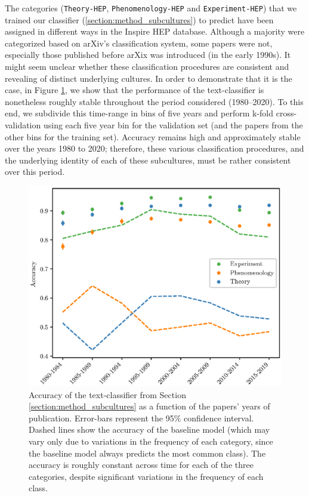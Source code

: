 \documentclass[smallextended]{svjour3}
\begin{document}
The categories (\texttt{Theory-HEP}, \texttt{Phenomenology-HEP} and \texttt{Experiment-HEP}) that we trained our classifier (\ref{section:method_subcultures}) to predict have been assigned in different ways in the Inspire HEP database. Although a majority were categorized based on arXiv's classification system, some papers were not, especially those published before arXix was introduced (in the early 1990s). It might seem unclear whether these classification procedures are consistent and revealing of distinct underlying cultures. In order to demonstrate that it is the case, in Figure \ref{fig:stability}, we show that the performance of the text-classifier is nonetheless roughly stable throughout the period considered (1980--2020). To this end, we subdivide this time-range in bins of five years and perform k-fold cross-validation using each five year bin for the validation set (and the papers from the other bins for the training set). Accuracy remains high and approximately stable over the years 1980 to 2020; therefore, these various classification procedures, and the underlying identity of each of these subcultures, must be rather consistent over this period.

\begin{figure}
    \centering
    \includegraphics{Fig8.eps}
    \caption{Accuracy of the text-classifier from Section \ref{section:method_subcultures} as a function of the papers' years of publication. Error-bars represent the 95\% confidence interval. Dashed lines show the accuracy of the baseline model (which may vary only due to variations in the frequency of each category, since the baseline model always predicts the most common class). The accuracy is roughly constant across time for each of the three categories, despite significant variations in the frequency of each class.}
    \label{fig:stability}
\end{figure}
\end{document}
